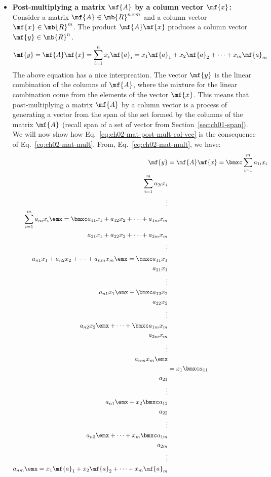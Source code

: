 \begin{itemize}
    \item \textbf{Post-multiplying a matrix $\mf{A}$ by a column vector $\mf{x}$:} Consider a matrix $\mf{A} \in \mb{R}^{n \times m}$ and a column vector $\mf{x} \in \mb{R}^m$. The product $\mf{A}\mf{x}$ produces a column vector $\mf{y} \in \mb{R}^n$.
    \begin{equation}
        \mf{y} = \mf{A}\mf{x} = \sum_{i=1}^n x_i\mf{a}_i = x_1 \mf{a}_1 + x_2 \mf{a}_2 + \cdots + x_m\mf{a}_m
        \label{eq:ch02-mat-post-mult-col-vec}
    \end{equation}
    The above equation has a nice interpreation. The vector $\mf{y}$ is the linear combination of the columns of $\mf{A}$, where the mixture for the linear combination come from the elements of the vector $\mf{x}$. This means that post-multiplying a matrix $\mf{A}$ by a column vector is a process of generating a vector from the span of the set formed by the columns of the matrix $\mf{A}$ (recall span of a set of vector from Section~\ref{sec:ch01-span}). We will now show how Eq.~\ref{eq:ch02-mat-post-mult-col-vec} is the consequence of Eq.~\ref{eq:ch02-mat-mult}. From, Eq.~\ref{eq:ch02-mat-mult}, we have:
    \[ \begin{split}
        \mf{y} &= \mf{A}\mf{x} = \bmxc \sum_{i=1}^m a_{1i}x_i \\ \sum_{i=1}^m a_{2i}x_i \\ \vdots \\ \sum_{i=1}^m a_{ni}x_i \emx = \bmxc a_{11}x_1 + a_{12}x_2 + \cdots + a_{1m}x_m \\ a_{21}x_1 + a_{22}x_2 + \cdots + a_{2m}x_m \\ \vdots \\ a_{n1}x_1 + a_{n2}x_2 + \cdots + a_{nm}x_m \emx = \bmxc a_{11}x_1 \\ a_{21}x_1 \\ \vdots \\ a_{n1}x_1\emx + \bmxc a_{12}x_2 \\ a_{22}x_2 \\ \vdots \\ a_{n2}x_2\emx + \cdots + \bmxc a_{1m}x_m \\ a_{2m}x_m \\ \vdots \\ a_{nm}x_m \emx \\
        &= x_1 \bmxc a_{11} \\ a_{21} \\ \vdots \\ a_{n1}\emx + x_2 \bmxc a_{12} \\ a_{22} \\ \vdots \\ a_{n2}\emx + \cdots + x_m\bmxc a_{1m} \\ a_{2m} \\ \vdots \\ a_{nm} \emx = x_1 \mf{a}_1 + x_2 \mf{a}_2 + \cdots + x_m\mf{a}_m
    \end{split} \]


\end{itemize}
